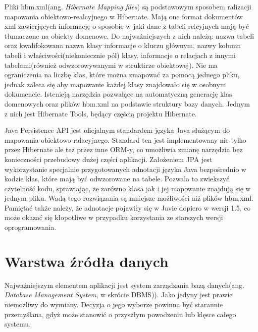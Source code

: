 Pliki hbm.xml(ang. \textit{Hibernate Mapping files}) są podstawowym sposobem ralizacji mapowania obiektowo-realcyjnego w Hibernate. Mają one format dokumentów xml zawierjących informację o sposobie w jaki dane z tabeli relcyjnych mają być tłumaczone na obiekty domenowe. Do najważniejszych z nich należą: nazwa tabeli oraz kwalifokowana nazwa klasy informacje o kluczu głównym, nazwy kolumn tabeli i właściwości(niekoniecznie pól) klasy, informacje o relacjach z innymi tabelami(również odwzorowywanymi w struktirze obiektowej). Nie ma ograniczenia na liczbę klas, które można zmapować za pomocą jednego pliku, jednak zaleca się aby mapowanie każdej klasy znajdowało się w osobnym dokumencie. Istenieją narzędzia pozwalące na automatyczną generację klas domenowych oraz plików hbm.xml na podstawie struktury bazy danych. Jednym z nich jest Hibernate Tools, będący częścią projektu Hibernate.

Java Persistence API jest oficjalnym standardem języka Java służącym do mapowania obiektowo-ralacyjnego. Standard ten jest implementowany nie tylko przez Hibernate ale też przez inne ORM-y, co umożliwia zmianę narzędzia bez konieczności przebudowy dużej części aplikacji. Założeniem JPA jest wykorzystanie specjalnie przygotowanych adnotacji języka Java bezpośrednio w kodzie klas, które mają być odwzorowane na tabele. Pozwala to zwiekszyć czytelność kodu, sprawiając, że zarówno klasa jak i jej mapowanie znajdują się w jednym pliku. Wadą tego rozwiązania są mniejsze możliwości niż plików hbm.xml. Pamiętać także należy, że adnotacje pojawiły się w Javie dopiero w wersji 1.5, co może okazać się kłopotliwe w przypadku korzystania ze starszych wersji oprogramowania.

\section[Warstwa źródła danych][Warstwa źródła danych]{Warstwa źródła danych}
Najważniejszym elementem aplikacji jest system zarządzania bazą danych(ang. \textit{Database Management System}, w skrócie DBMS)). Jako jedyny jest prawie niemożliwy do wymiany. Decyzja o jego wyborze powinna być starannie przemyślana, gdyż może stanowić o przyszłym powodzeniu lub klęsce całego systemu.

